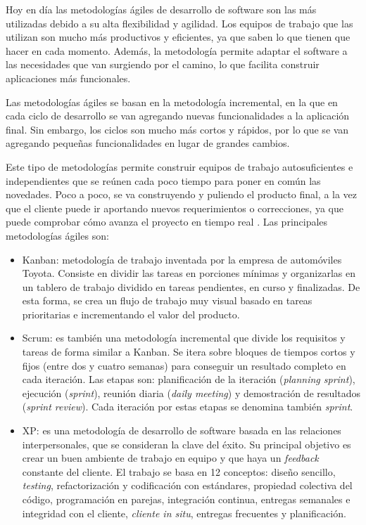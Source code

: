 Hoy en día las metodologías ágiles de desarrollo de software son las más utilizadas 
debido a su alta flexibilidad y agilidad. Los equipos de trabajo que las utilizan son 
mucho más productivos y eficientes, ya que saben lo que tienen que hacer en cada momento. 
Además, la metodología permite adaptar el software a las necesidades que van surgiendo 
por el camino, lo que facilita construir aplicaciones más funcionales.
    
Las metodologías ágiles se basan en la metodología incremental, en la que en cada ciclo 
de desarrollo se van agregando nuevas funcionalidades a la aplicación final. Sin embargo, 
los ciclos son mucho más cortos y rápidos, por lo que se van agregando pequeñas 
funcionalidades en lugar de grandes cambios.
    
Este tipo de metodologías permite construir equipos de trabajo autosuficientes e 
independientes que se reúnen cada poco tiempo para poner en común las novedades. 
Poco a poco, se va construyendo y puliendo el producto final, a la vez que el cliente 
puede ir aportando nuevos requerimientos o correcciones, ya que puede comprobar cómo 
avanza el proyecto en tiempo real \citep{pacienzia2015metodologias}. 
Las principales metodologías ágiles son:

\begin{itemize}
	\item Kanban: metodología de trabajo inventada por la empresa de automóviles Toyota. Consiste en dividir las tareas en porciones mínimas y organizarlas en un tablero de trabajo dividido en tareas pendientes, en curso y finalizadas. De esta forma, se crea un flujo de trabajo muy visual basado en tareas prioritarias e incrementando el valor del producto.
	\item Scrum: es también una metodología incremental que divide los requisitos y tareas de forma similar a Kanban. Se itera sobre bloques de tiempos cortos y fijos (entre dos y cuatro semanas) para conseguir un resultado completo en cada iteración. Las etapas son: planificación de la iteración (\textit{planning sprint}), ejecución (\textit{sprint}), reunión diaria (\textit{daily meeting}) y demostración de resultados (\textit{sprint review}). Cada iteración por estas etapas se denomina también \textit{sprint}. 
	\item \ac{XP}: es una metodología de desarrollo de software basada en las relaciones interpersonales, que se consideran la clave del éxito. Su principal objetivo es crear un buen ambiente de trabajo en equipo y que haya un \textit{feedback} constante del cliente. El trabajo se basa en 12 conceptos: diseño sencillo, \textit{testing}, refactorización y codificación con estándares, propiedad colectiva del código, programación en parejas, integración continua, entregas semanales e integridad con el cliente, \textit{cliente in situ}, entregas frecuentes y planificación.
\end{itemize}
    
